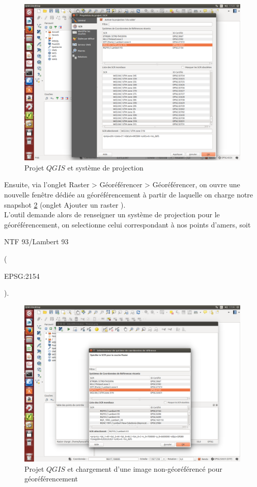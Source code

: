 \documentclass{book}
\begin{document}
\begin{figure}[H]
\begin{center}
\includegraphics[scale=0.3]{images/qgis-projet.png}
\end{center}
\caption{Projet $QGIS$ et système de projection}
\label{qgis-projet}
\end{figure}

\clearpage

Ensuite, via l'onglet \og Raster > Géoréférencer > Géoréférencer\fg{}, on ouvre 
une nouvelle fen\^{e}tre dédiée au géoréférencement à partir de laquelle on charge notre snapshot \ref{qgis-georef} 
(onglet \og Ajouter un raster \fg{}).\\
L'outil demande alors de renseigner un système de projection pour le géoréférencement, on selectionne celui correspondant 
à nos points d'amers, soit \begin{itshape}NTF 93/Lambert 93\end{itshape} (\begin{itshape}EPSG:2154\end{itshape}).

\begin{figure}[H]
\begin{center}
\includegraphics[scale=0.3]{images/qgis-georef.png}
\end{center}
\caption{Projet $QGIS$ et chargement d'une image non-géoréférencé pour géoréférencement}
\label{qgis-georef}
\end{figure}
\end{document}
